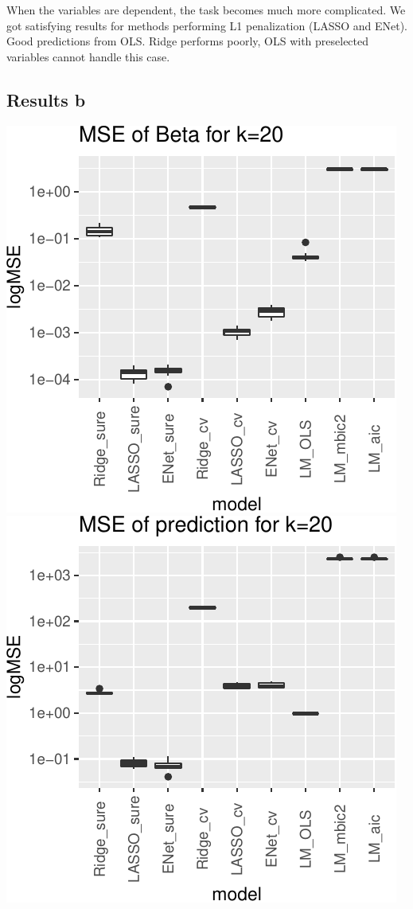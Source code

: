 \documentclass[
]{article}
\begin{document}
When the variables are dependent, the task becomes much more
complicated. We got satisfying results for methods performing L1
penalization (LASSO and ENet). Good predictions from OLS. Ridge performs
poorly, OLS with preselected variables cannot handle this case.

\hypertarget{results-b-1}{%
\subsection{Results b}\label{results-b-1}}

\includegraphics[width=0.8\linewidth]{report_files/figure-latex/unnamed-chunk-16-1}
\includegraphics[width=0.8\linewidth]{report_files/figure-latex/unnamed-chunk-16-2}
\end{document}
